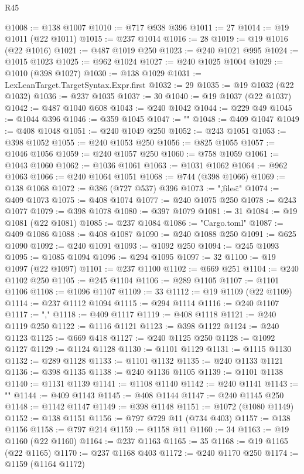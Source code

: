 \begin{lexlean}{R45}
\begin{coremodule}
@1008 := @138 @1007
@1010 := @717 @938 @396
@1011 := 27
@1014 := @19 @1011 (@22 @1011)
@1015 := @237 @1014
@1016 := 28
@1019 := @19 @1016 (@22 @1016)
@1021 := @487 @1019 @250
@1023 := @240 @1021 @995
@1024 := @1015 @1023
@1025 := @962 @1024
@1027 := @240 @1025 @1004
@1029 := @1010 (@398 @1027)
@1030 := @138 @1029
@1031 := LexLeanTarget.TargetSyntax.Expr.first
@1032 := 29
@1035 := @19 @1032 (@22 @1032)
@1036 := @237 @1035
@1037 := 30
@1040 := @19 @1037 (@22 @1037)
@1042 := @487 @1040 @608
@1043 := @240 @1042
@1044 := @229 @49
@1045 := @1044 @396
@1046 := @359 @1045
@1047 := "\""
@1048 := @409 @1047
@1049 := @408 @1048
@1051 := @240 @1049 @250
@1052 := @243 @1051
@1053 := @398 @1052
@1055 := @240 @1053 @250
@1056 := @825 @1055
@1057 := @1046 @1056
@1059 := @240 @1057 @250
@1060 := @758 @1059
@1061 := @1043 @1060
@1062 := @1036 @1061
@1063 := @1031 @1062
@1064 := @962 @1063
@1066 := @240 @1064 @1051
@1068 := @744 (@398 @1066)
@1069 := @138 @1068
@1072 := @386 (@727 @537) @396
@1073 := ",\"files\":{"
@1074 := @409 @1073
@1075 := @408 @1074
@1077 := @240 @1075 @250
@1078 := @243 @1077
@1079 := @398 @1078
@1080 := @397 @1079
@1081 := 31
@1084 := @19 @1081 (@22 @1081)
@1085 := @237 @1084
@1086 := "Cargo.toml"
@1087 := @409 @1086
@1088 := @408 @1087
@1090 := @240 @1088 @250
@1091 := @625 @1090
@1092 := @240 @1091
@1093 := @1092 @250
@1094 := @245 @1093
@1095 := @1085 @1094
@1096 := @294 @1095
@1097 := 32
@1100 := @19 @1097 (@22 @1097)
@1101 := @237 @1100
@1102 := @669 @251
@1104 := @240 @1102 @250
@1105 := @245 @1104
@1106 := @289 @1105
@1107 := @1101 @1106
@1108 := @1096 @1107
@1109 := 33
@1112 := @19 @1109 (@22 @1109)
@1114 := @237 @1112 @1094
@1115 := @294 @1114
@1116 := @240 @1107
@1117 := ","
@1118 := @409 @1117
@1119 := @408 @1118
@1121 := @240 @1119 @250
@1122 := @1116 @1121
@1123 := @398 @1122
@1124 := @240 @1123
@1125 := @669 @418
@1127 := @240 @1125 @250
@1128 := @1092 @1127
@1129 := @1124 @1128
@1130 := @1101 @1129
@1131 := @1115 @1130
@1132 := @289 @1128
@1133 := @1101 @1132
@1135 := @240 @1133 @1121
@1136 := @398 @1135
@1138 := @240 @1136 @1105
@1139 := @1101 @1138
@1140 := @1131 @1139
@1141 := @1108 @1140
@1142 := @240 @1141
@1143 := "}"
@1144 := @409 @1143
@1145 := @408 @1144
@1147 := @240 @1145 @250
@1148 := @1142 @1147
@1149 := @398 @1148
@1151 := @1072 (@1080 @1149)
@1152 := @138 @1151
@1156 := @797 @729 @11 (@734 @403)
@1157 := @138 @1156
@1158 := @797 @214
@1159 := @1158 @11
@1160 := 34
@1163 := @19 @1160 (@22 @1160)
@1164 := @237 @1163
@1165 := 35
@1168 := @19 @1165 (@22 @1165)
@1170 := @237 @1168 @403
@1172 := @240 @1170 @250
@1174 := @1159 (@1164 @1172)

\end{coremodule}
\end{lexlean}
